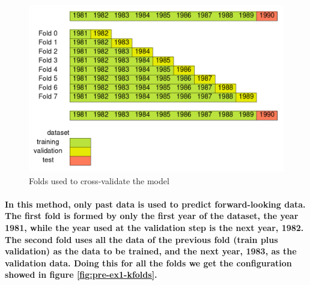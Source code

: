 \documentclass[a4paper]{article}
\begin{document}
\begin{figure}[ht]
    \centering
    \includegraphics[width=12cm]{figure_0_kfold}
    \caption{Folds used to cross-validate the model}
    \label{fig:pre-ex1-folds}
\end{figure}

\paragraph{In this method, only past data is used to predict forward-looking data. The first fold is formed by only the first year of the dataset, the year 1981, while the year used at the validation step is the next year, 1982. The second fold uses all the data of the previous fold (train plus validation) as the data to be trained, and the next year, 1983, as the validation data. Doing this for all the folds we get the configuration showed in figure \ref{fig:pre-ex1-kfolds}.}
\end{document}
